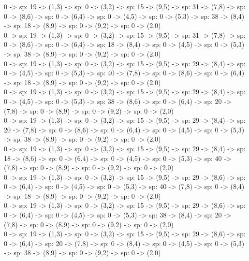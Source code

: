\documentclass[10pt,a4paper]{article}
\begin{document}
0 -> sp: 19 -> (1,3) -> sp: 0 -> (3,2) -> sp: 15 -> (9,5) -> sp: 31 -> (7,8) -> sp: 0 -> (8,6) -> sp: 0 -> (6,4) -> sp: 0 -> (4,5) -> sp: 0 -> (5,3) -> sp: 38 -> (8,4) -> sp: 18 -> (8,9) -> sp: 0 -> (9,2) -> sp: 0 -> (2,0)\\

0 -> sp: 19 -> (1,3) -> sp: 0 -> (3,2) -> sp: 15 -> (9,5) -> sp: 31 -> (7,8) -> sp: 0 -> (8,6) -> sp: 0 -> (6,4) -> sp: 18 -> (8,4) -> sp: 0 -> (4,5) -> sp: 0 -> (5,3) -> sp: 38 -> (8,9) -> sp: 0 -> (9,2) -> sp: 0 -> (2,0)\\

0 -> sp: 19 -> (1,3) -> sp: 0 -> (3,2) -> sp: 15 -> (9,5) -> sp: 29 -> (8,4) -> sp: 0 -> (4,5) -> sp: 0 -> (5,3) -> sp: 40 -> (7,8) -> sp: 0 -> (8,6) -> sp: 0 -> (6,4) -> sp: 18 -> (8,9) -> sp: 0 -> (9,2) -> sp: 0 -> (2,0)\\

0 -> sp: 19 -> (1,3) -> sp: 0 -> (3,2) -> sp: 15 -> (9,5) -> sp: 29 -> (8,4) -> sp: 0 -> (4,5) -> sp: 0 -> (5,3) -> sp: 38 -> (8,6) -> sp: 0 -> (6,4) -> sp: 20 -> (7,8) -> sp: 0 -> (8,9) -> sp: 0 -> (9,2) -> sp: 0 -> (2,0)\\

0 -> sp: 19 -> (1,3) -> sp: 0 -> (3,2) -> sp: 15 -> (9,5) -> sp: 29 -> (8,4) -> sp: 20 -> (7,8) -> sp: 0 -> (8,6) -> sp: 0 -> (6,4) -> sp: 0 -> (4,5) -> sp: 0 -> (5,3) -> sp: 38 -> (8,9) -> sp: 0 -> (9,2) -> sp: 0 -> (2,0)\\

0 -> sp: 19 -> (1,3) -> sp: 0 -> (3,2) -> sp: 15 -> (9,5) -> sp: 29 -> (8,4) -> sp: 18 -> (8,6) -> sp: 0 -> (6,4) -> sp: 0 -> (4,5) -> sp: 0 -> (5,3) -> sp: 40 -> (7,8) -> sp: 0 -> (8,9) -> sp: 0 -> (9,2) -> sp: 0 -> (2,0)\\

0 -> sp: 19 -> (1,3) -> sp: 0 -> (3,2) -> sp: 15 -> (9,5) -> sp: 29 -> (8,6) -> sp: 0 -> (6,4) -> sp: 0 -> (4,5) -> sp: 0 -> (5,3) -> sp: 40 -> (7,8) -> sp: 0 -> (8,4) -> sp: 18 -> (8,9) -> sp: 0 -> (9,2) -> sp: 0 -> (2,0)\\

0 -> sp: 19 -> (1,3) -> sp: 0 -> (3,2) -> sp: 15 -> (9,5) -> sp: 29 -> (8,6) -> sp: 0 -> (6,4) -> sp: 0 -> (4,5) -> sp: 0 -> (5,3) -> sp: 38 -> (8,4) -> sp: 20 -> (7,8) -> sp: 0 -> (8,9) -> sp: 0 -> (9,2) -> sp: 0 -> (2,0)\\

0 -> sp: 19 -> (1,3) -> sp: 0 -> (3,2) -> sp: 15 -> (9,5) -> sp: 29 -> (8,6) -> sp: 0 -> (6,4) -> sp: 20 -> (7,8) -> sp: 0 -> (8,4) -> sp: 0 -> (4,5) -> sp: 0 -> (5,3) -> sp: 38 -> (8,9) -> sp: 0 -> (9,2) -> sp: 0 -> (2,0)\\
\end{document}
